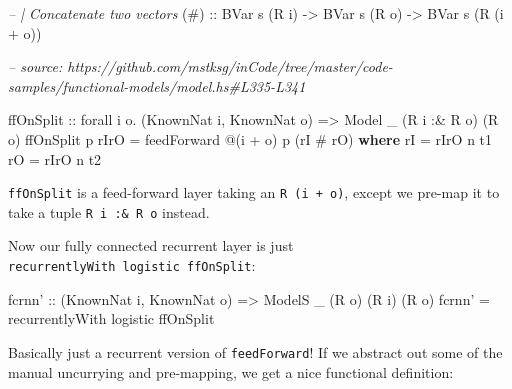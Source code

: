 \documentclass[]{article}
\newenvironment{Shaded}{}{}
\newcommand{\CommentTok}[1]{\textcolor[rgb]{0.38,0.63,0.69}{\textit{#1}}}
\newcommand{\DataTypeTok}[1]{\textcolor[rgb]{0.56,0.13,0.00}{#1}}
\newcommand{\FunctionTok}[1]{\textcolor[rgb]{0.02,0.16,0.49}{#1}}
\newcommand{\KeywordTok}[1]{\textcolor[rgb]{0.00,0.44,0.13}{\textbf{#1}}}
\newcommand{\NormalTok}[1]{#1}
\newcommand{\OtherTok}[1]{\textcolor[rgb]{0.00,0.44,0.13}{#1}}
\begin{document}
\begin{Shaded}
\begin{Highlighting}[]
\CommentTok{-- | Concatenate two vectors}
\OtherTok{(#)          ::} \DataTypeTok{BVar}\NormalTok{ s (}\DataTypeTok{R}\NormalTok{ i) }\OtherTok{->} \DataTypeTok{BVar}\NormalTok{ s (}\DataTypeTok{R}\NormalTok{ o) }\OtherTok{->} \DataTypeTok{BVar}\NormalTok{ s (}\DataTypeTok{R}\NormalTok{ (i }\FunctionTok{+}\NormalTok{ o))}

\CommentTok{-- source: https://github.com/mstksg/inCode/tree/master/code-samples/functional-models/model.hs#L335-L341}

\NormalTok{ffOnSplit}
\OtherTok{    ::}\NormalTok{ forall i o}\FunctionTok{.}\NormalTok{ (}\DataTypeTok{KnownNat}\NormalTok{ i, }\DataTypeTok{KnownNat}\NormalTok{ o)}
    \OtherTok{=>} \DataTypeTok{Model}\NormalTok{ _ (}\DataTypeTok{R}\NormalTok{ i }\FunctionTok{:&} \DataTypeTok{R}\NormalTok{ o) (}\DataTypeTok{R}\NormalTok{ o)}
\NormalTok{ffOnSplit p rIrO }\FunctionTok{=}\NormalTok{ feedForward }\FunctionTok{@}\NormalTok{(i }\FunctionTok{+}\NormalTok{ o) p (rI }\FunctionTok{#}\NormalTok{ rO)}
  \KeywordTok{where}
\NormalTok{    rI }\FunctionTok{=}\NormalTok{ rIrO }\FunctionTok{^^.}\NormalTok{ t1}
\NormalTok{    rO }\FunctionTok{=}\NormalTok{ rIrO }\FunctionTok{^^.}\NormalTok{ t2}
\end{Highlighting}
\end{Shaded}

\texttt{ffOnSplit} is a feed-forward layer taking an \texttt{R\ (i\ +\ o)},
except we pre-map it to take a tuple \texttt{R\ i\ :\&\ R\ o} instead.

Now our fully connected recurrent layer is just
\texttt{recurrentlyWith\ logistic\ ffOnSplit}:

\begin{Shaded}
\begin{Highlighting}[]
\NormalTok{fcrnn'}
\OtherTok{    ::}\NormalTok{ (}\DataTypeTok{KnownNat}\NormalTok{ i, }\DataTypeTok{KnownNat}\NormalTok{ o)}
    \OtherTok{=>} \DataTypeTok{ModelS}\NormalTok{ _ (}\DataTypeTok{R}\NormalTok{ o) (}\DataTypeTok{R}\NormalTok{ i) (}\DataTypeTok{R}\NormalTok{ o)}
\NormalTok{fcrnn' }\FunctionTok{=}\NormalTok{ recurrentlyWith logistic ffOnSplit}
\end{Highlighting}
\end{Shaded}

Basically just a recurrent version of \texttt{feedForward}! If we abstract out
some of the manual uncurrying and pre-mapping, we get a nice functional
definition:
\end{document}
